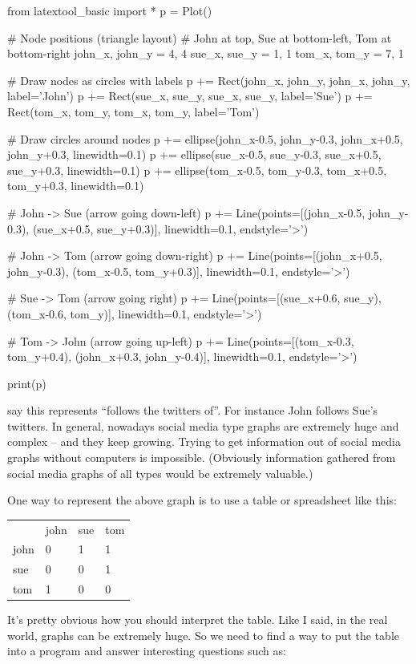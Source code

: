 \begin{python}
from latextool_basic import *
p = Plot()

# Node positions (triangle layout)
# John at top, Sue at bottom-left, Tom at bottom-right
john_x, john_y = 4, 4
sue_x, sue_y = 1, 1
tom_x, tom_y = 7, 1

# Draw nodes as circles with labels
p += Rect(john_x, john_y, john_x, john_y, label='John')
p += Rect(sue_x, sue_y, sue_x, sue_y, label='Sue')
p += Rect(tom_x, tom_y, tom_x, tom_y, label='Tom')

# Draw circles around nodes
p += ellipse(john_x-0.5, john_y-0.3, john_x+0.5, john_y+0.3, linewidth=0.1)
p += ellipse(sue_x-0.5, sue_y-0.3, sue_x+0.5, sue_y+0.3, linewidth=0.1)
p += ellipse(tom_x-0.5, tom_y-0.3, tom_x+0.5, tom_y+0.3, linewidth=0.1)

# John -> Sue (arrow going down-left)
p += Line(points=[(john_x-0.5, john_y-0.3), (sue_x+0.5, sue_y+0.3)], linewidth=0.1, endstyle='>')

# John -> Tom (arrow going down-right)
p += Line(points=[(john_x+0.5, john_y-0.3), (tom_x-0.5, tom_y+0.3)], linewidth=0.1, endstyle='>')

# Sue -> Tom (arrow going right)
p += Line(points=[(sue_x+0.6, sue_y), (tom_x-0.6, tom_y)], linewidth=0.1, endstyle='>')

# Tom -> John (arrow going up-left)
p += Line(points=[(tom_x-0.3, tom_y+0.4), (john_x+0.3, john_y-0.4)], linewidth=0.1, endstyle='>')

print(p)
\end{python}

say this represents ``follows the twitters of''. For instance John
follows Sue's twitters. In general, nowadays social media type graphs
are extremely huge and complex -- and they keep growing. Trying to get
information out of social media graphs without computers is impossible.
(Obviously information gathered from social media graphs of all types
would be extremely valuable.)

One way to represent the above graph is to use a table or spreadsheet
like this:

\begin{tabular}{llll}
& john & sue & tom \\
john & 0 & 1 & 1 \\
sue & 0 & 0 & 1 \\
tom & 1 & 0 & 0 \\
\end{tabular}

It's pretty obvious how you should interpret the table. Like I said, in
the real world, graphs can be extremely huge. So we need to find a way
to put the table into a program and answer interesting questions such
as:

